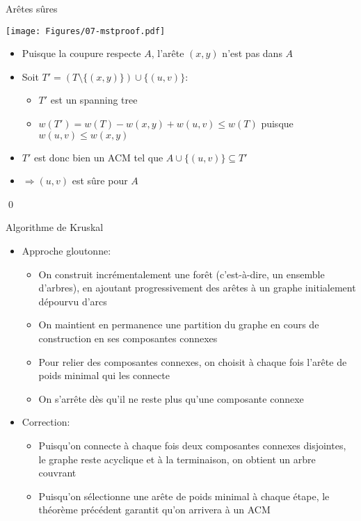 \begin{frame}{Arêtes sûres}

\centerline{\texttt{[image: Figures/07-mstproof.pdf]}}

\begin{itemize}
\item Puisque la coupure respecte $A$, l'arête $(x,y)$ n'est pas dans $A$
\item Soit $T'=(T\setminus\{(x,y)\})\cup \{(u,v)\}$:
\begin{itemize}
\item $T'$ est un spanning tree
\item $w(T')=w(T)-w(x,y)+w(u,v)\leq w(T)$ puisque $w(u,v)\leq w(x,y)$
\end{itemize}
\item $T'$ est donc bien un ACM tel que $A\cup\{(u,v)\}\subseteq T'$
\item $\Rightarrow (u,v)$ est sûre pour $A$
\end{itemize}\qed

\end{frame}

\begin{frame}{Algorithme de Kruskal}
\begin{itemize}
\item Approche gloutonne:
\begin{itemize}
\item On construit incrémentalement une forêt (c'est-à-dire, un
  ensemble d'arbres), en ajoutant progressivement des arêtes à un
  graphe initialement dépourvu d'arcs
\item On maintient en permanence une partition du graphe en cours de construction en ses composantes connexes
\item Pour relier des composantes connexes, on choisit à chaque fois l'arête de poids minimal qui les connecte
\item On s'arrête dès qu'il ne reste plus qu'une composante connexe
\end{itemize}

\bigskip

\item Correction:
\begin{itemize}
\item Puisqu'on connecte à chaque fois deux composantes connexes
  disjointes, le graphe reste acyclique et à la terminaison, on obtient un arbre couvrant
\item Puisqu'on sélectionne une arête de poids minimal à chaque étape,
  le théorème précédent garantit qu'on arrivera à un ACM
\end{itemize}
\end{itemize}

\end{frame}

